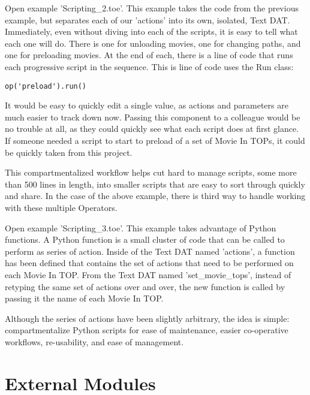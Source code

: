 \begin{fullwidth}
Open example 'Scripting\_2.toe'. This example takes the code from the previous example, but separates each of our 'actions' into its own, isolated, Text DAT. Immediately, even without diving into each of the scripts, it is easy to tell what each one will do. There is one for unloading movies, one for changing paths, and one for preloading movies. At the end of each, there is a line of code that runs each progressive script in the sequence. This is line of code uses the Run class:

\begin{lstlisting}
op('preload').run()
\end{lstlisting}

It would be easy to quickly edit a single value, as actions and parameters are much easier to track down now. Passing this component to a colleague would be no trouble at all, as they could quickly see what each script does at first glance. If someone needed a script to start to preload of a set of Movie In TOPs, it could be quickly taken from this project.

This compartmentalized workflow helps cut hard to manage scripts, some more than 500 lines in length, into smaller scripts that are easy to sort through quickly and share. In the case of the above example, there is third way to handle working with these multiple Operators.

Open example 'Scripting\_3.toe'. This example takes advantage of Python functions. A Python function is a small cluster of code that can be called to perform as series of action. Inside of the Text DAT named 'actions', a function has been defined that contains the set of actions that need to be performed on each Movie In TOP. From the Text DAT named 'set\_movie\_tops', instead of retyping the same set of actions over and over, the new function is called by passing it the name of each Movie In TOP.

Although the series of actions have been slightly arbitrary, the idea is simple: compartmentalize Python scripts for ease of maintenance, easier co-operative workflows, re-usability, and ease of management.

\end{fullwidth}


\section{External Modules}

